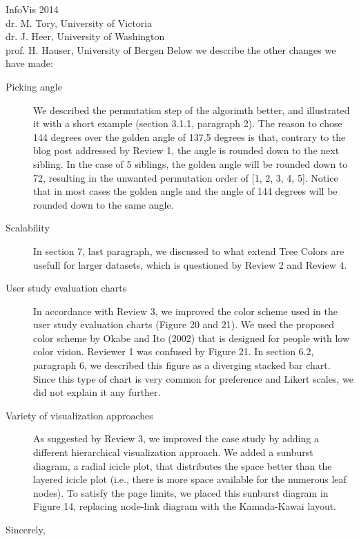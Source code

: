 \documentclass{letter}
\begin{document}
\begin{letter}{InfoVis 2014 \\ dr. M. Tory, University of Victoria \\ dr. J. Heer, University of Washington \\ prof. H. Hauser, University of Bergen}
Below we describe the other changes we have made:

\begin{description}
\item[Picking angle] We described the permutation step of the algorimth better, and illustrated it with a short example (section 3.1.1, paragraph 2). The reason to chose 144 degrees over the golden angle of 137,5 degrees is that, contrary to the blog post addressed by Review 1, the angle is rounded down to the next sibling. In the case of 5 siblings, the golden angle will be rounded down to 72, resulting in the unwanted permutation order of [1, 2, 3, 4, 5]. Notice that in most cases the golden angle and the angle of 144 degrees will be rounded down to the same angle.
\item[Scalability] In section 7, last paragraph, we discussed to what extend Tree Colors are usefull for larger datasets, which is questioned by Review 2 and Review 4.
\item[User study evaluation charts] In accordance with Review 3, we improved the color scheme used in the user study evaluation charts (Figure 20 and 21). We used the proposed color scheme by Okabe and Ito (2002) that is designed for people with low color vision. Reviewer 1 was confused by Figure 21. In section 6.2, paragraph 6, we described this figure as a diverging stacked bar chart. Since this type of chart is very common for preference and Likert scales, we did not explain it any further.
\item[Variety of visualization approaches] As suggested by Review 3, we improved the case study by adding a different hierarchical visualization approach. We added a sunburst diagram, a radial icicle plot, that distributes the space better than the layered icicle plot (i.e., there is more space available for the numerous leaf nodes). To satisfy the page limits, we placed this sunburst diagram in Figure 14, replacing node-link diagram with the Kamada-Kawai layout.
\end{description}







\closing{Sincerely,}
\end{letter}
\end{document}
